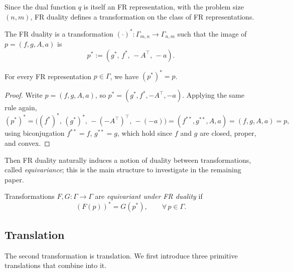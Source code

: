 Since the dual function \(q\) is itself an FR representation, with the problem size \((n, m)\), FR duality defines a transformation on the class of FR representations.


\begin{definition}[FR Duality]
The FR duality is a transformation \((\cdot)^*: \Gamma_{m, n} \to \Gamma_{n, m}\) such that the image of \(p=(f,g,A,a)\) is
\[
p^*
:=
(g^*,\,f^*,\,-A^\top,\,-a).
\]
\end{definition}


 
\begin{proposition}
\label{prop:involution}
For every FR representation \(p \in \Gamma\), we have \((p^*)^*=p\).
\end{proposition}

\begin{proof}
Write \(p=(f,g,A,a)\), so \(p^*=(g^*,f^*,-A^\top,-a)\). Applying the
same rule again,
\[
(p^*)^*
=
\bigl((f^*)^*,\,(g^*)^*,\,-(-A^\top)^\top,\,-(-a)\bigr)
=
(f^{**},g^{**},A,a)
=
(f,g,A,a)
=
p,
\]
using biconjugation \(f^{**}=f\), \(g^{**}=g\), which hold since \(f\) and \(g\) are closed, proper, and convex.
\end{proof}

Then FR duality naturally induces a notion of duality between transformations, called \emph{equivariance}; this is the main structure to investigate in the remaining paper.

\begin{definition}
\label{def:equivariance}
Transformations \(F,G:\Gamma\to\Gamma\) are \emph{equivariant under FR duality} if
\[
(F(p))^*=G(p^*),
\qquad
\forall\,p\in\Gamma.
\]
\end{definition}

















\subsection{Translation}
\label{subsec:translation}
The second transformation is translation. We first introduce three
primitive translations that combine into it.

